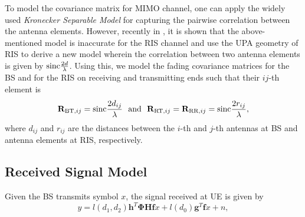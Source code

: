\documentclass[journal,draftclsnofoot,onecolumn,12pt]{IEEEtran}
\begin{document}
To model the covariance matrix for MIMO channel, one can apply the widely used  \emph{Kronecker Separable Model
} \cite{KSM} for capturing the pairwise correlation between the antenna elements. However, recently in \cite{RIS_Corr_Fad}, it is shown that the above-mentioned model is inaccurate for the RIS channel and use the UPA geometry of RIS to derive a new model wherein the correlation between two antenna elements is given by ${\rm sinc}\frac{2d}{\lambda}$. 
Using this, we model the fading covariance matrices for the BS and for the RIS on receiving and transmitting ends such that their $ij$-th element is
\begin{equation*}
    \mathbf{R}_{{\rm BT},{ij}} = {\rm sinc}\frac{2d_{ij}}{\lambda} \text{~~and~~}\mathbf{R}_{{\rm RT},{ij}} = \mathbf{R}_{{\rm RR},{ij}} = {\rm sinc}\frac{2r_{ij}}{\lambda},
\end{equation*}
where $d_{ij}$ and $r_{ij}$ are the distances between the $i$-th and $j$-th antennas at BS and antenna elements at RIS, respectively.
\vspace{-.4cm}\subsection{Received Signal Model}\vspace{-.2cm}
Given the BS transmits symbol $x$, the signal received at UE is given by 
\begin{equation}
    y = l(d_1,d_2)\mathbf{h}^T\mathbf{\Phi Hf}x + l(d_0)\mathbf{g}^T\mathbf{f}x +n,\label{RxSig}
\end{equation}
\end{document}
